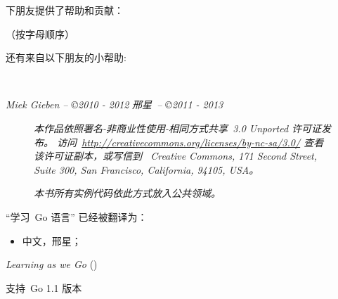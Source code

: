 \documentclass[a4paper,twoside,openleft]{blocksbook}
\begin{document}
\vspace*{0.5cm}
\begin{center}
下朋友提供了帮助和贡献：

（{\small 按字母顺序}）


还有来自以下朋友的小帮助:


\end{center}
\vfill
\begin{center}
    \hspace*{1cm}\\[2.5ex]
    \hspace*{1cm}{\tiny\CcNote{\CcLongnameByNcSa}}
\end{center}
\begin{center}
\hspace*{1cm}\emph{Miek Gieben -- \copyright 2010 - 2012}
\hspace*{1cm}\emph{邢星~-- \copyright 2011 - 2013}
\end{center}
\vspace{-3em}

\newpage

\thispagestyle{empty}
\begin{figure}[H]
\emph{
本作品依照署名-非商业性使用-相同方式共享~3.0 Unported 许可证发布。
访问~\url{http://creativecommons.org/licenses/by-nc-sa/3.0/} 
查看该许可证副本，或写信到~
Creative Commons, 171 Second Street, Suite 300, San Francisco, California, 94105, USA。}    
\vspace{2em}

\emph{本书所有实例代码依此方式放入公共领域。}

\end{figure}

``学习~Go 语言'' 已经被翻译为：
\begin{itemize}
\item 中文，邢星；
\end{itemize}

\begin{center}
\vfill
\emph{Learning as we Go}
(\emph{\version})

\tiny{支持~Go 1.1 版本}
\vspace{.2\stockheight}
\end{center}

\clearpage

\tableofcontents*
\listoffigures*
\listofcode* 
\listofex* 
\clearpage
\end{document}
